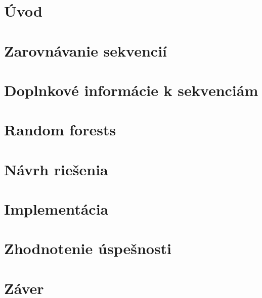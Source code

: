 {}
\chapter*{Úvod}
%
\chapter{Zarovnávanie sekvencií}
\chapter{Doplnkové informácie k sekvenciám}
\chapter{Random forests}
\chapter{Návrh riešenia}
\chapter{Implementácia}
\chapter{Zhodnotenie úspešnosti}
{}
\chapter*{Záver}
